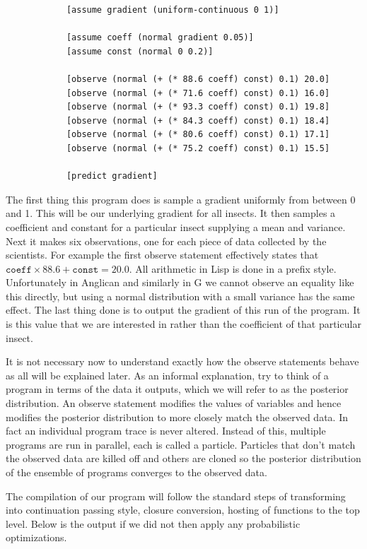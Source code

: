 \documentclass[a4paper]{article}
\begin{document}
\begin{center}
	\begin{varwidth}{\linewidth}
		\small
		\begin{verbatim}
			[assume gradient (uniform-continuous 0 1)]

			[assume coeff (normal gradient 0.05)]
			[assume const (normal 0 0.2)]

			[observe (normal (+ (* 88.6 coeff) const) 0.1) 20.0]
			[observe (normal (+ (* 71.6 coeff) const) 0.1) 16.0]
			[observe (normal (+ (* 93.3 coeff) const) 0.1) 19.8]
			[observe (normal (+ (* 84.3 coeff) const) 0.1) 18.4]
			[observe (normal (+ (* 80.6 coeff) const) 0.1) 17.1]
			[observe (normal (+ (* 75.2 coeff) const) 0.1) 15.5]

			[predict gradient]
		\end{verbatim}
	\end{varwidth}
\end{center}
The first thing this program does is sample a gradient uniformly from between 0 and 1. This will be our underlying gradient for all insects. It then samples a coefficient and constant for a particular insect supplying a mean and variance. Next it makes six observations, one for each piece of data collected by the scientists. For example the first observe statement effectively states that \(\texttt{coeff} \times 88.6 + \texttt{const} = 20.0\). All arithmetic in Lisp is done in a prefix style. Unfortunately in Anglican and similarly in G we cannot observe an equality like this directly, but using a normal distribution with a small variance has the same effect. The last thing done is to output the gradient of this run of the program. It is this value that we are interested in rather than the coefficient of that particular insect.

It is not necessary now to understand exactly how the observe statements behave as all will be explained later. As an informal explanation, try to think of a program in terms of the data it outputs, which we will refer to as the posterior distribution. An observe statement modifies the values of variables and hence modifies the posterior distribution to more closely match the observed data. In fact an individual program trace is never altered. Instead of this, multiple programs are run in parallel, each is called a particle. Particles that don't match the observed data are killed off and others are cloned so the posterior distribution of the ensemble of programs converges to the observed data.

The compilation of our program will follow the standard steps of transforming into continuation passing style, closure conversion, hosting of functions to the top level. Below is the output if we did not then apply any probabilistic optimizations.
\end{document}
